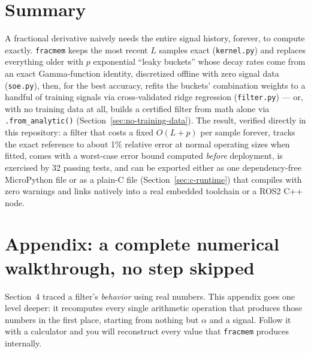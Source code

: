 \documentclass[11pt]{article}
\begin{document}
\section{Summary}

\begin{recap}
A fractional derivative naively needs the entire signal history, forever, to compute exactly. \texttt{fracmem} keeps the most recent $L$ samples exact (\texttt{kernel.py}) and replaces everything older with $p$ exponential ``leaky buckets'' whose decay rates come from an exact Gamma-function identity, discretized offline with zero signal data (\texttt{soe.py}), then, for the best accuracy, refits the buckets' combination weights to a handful of training signals via cross-validated ridge regression (\texttt{filter.py}) --- or, with no training data at all, builds a certified filter from math alone via \texttt{.from\_analytic()} (Section~\ref{sec:no-training-data}). The result, verified directly in this repository: a filter that costs a fixed $O(L{+}p)$ per sample forever, tracks the exact reference to about 1\% relative error at normal operating sizes when fitted, comes with a worst-case error bound computed \emph{before} deployment, is exercised by 32 passing tests, and can be exported either as one dependency-free MicroPython file or as a plain-C file (Section~\ref{sec:c-runtime}) that compiles with zero warnings and links natively into a real embedded toolchain or a ROS2 C++ node.
\end{recap}

\section{Appendix: a complete numerical walkthrough, no step skipped}

Section~4 traced a filter's \emph{behavior} using real numbers. This appendix goes one level deeper: it recomputes every single arithmetic operation that produces those numbers in the first place, starting from nothing but $\alpha$ and a signal. Follow it with a calculator and you will reconstruct every value that \texttt{fracmem} produces internally.
\end{document}
